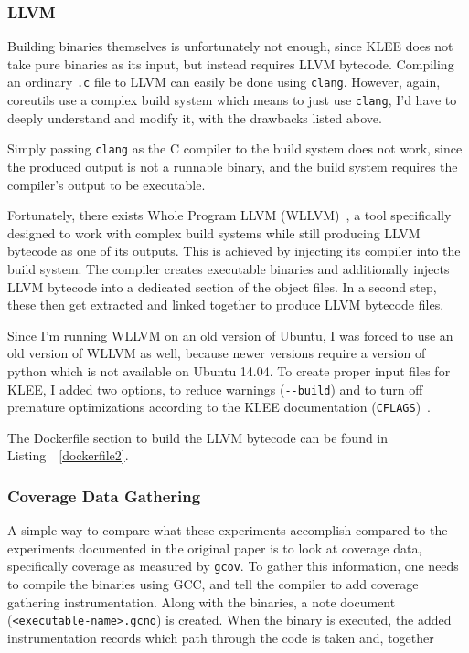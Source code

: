 \documentclass{article}
\let\savedCite=\cite
\renewcommand{\cite}{\unskip~\savedCite}
\let\savedRef=\ref
\renewcommand{\ref}{\unskip~\savedRef}
\begin{document}
\begin{multicols}{2}

    \subsubsection{LLVM}
    \label{LLVM}

    Building binaries themselves is unfortunately not enough, since KLEE does not take pure binaries as its input, but instead requires LLVM bytecode. Compiling an ordinary \lstinline{.c} file to LLVM can easily be done using \lstinline{clang}. However, again, coreutils use a complex build system which means to just use \lstinline{clang}, I'd have to deeply understand and modify it, with the drawbacks listed above.

    Simply passing \lstinline{clang} as the C compiler to the build system does not work, since the produced output is not a runnable binary, and the build system requires the compiler's output to be executable.

    Fortunately, there exists Whole Program LLVM (WLLVM)\cite{WLLVM}, a tool specifically designed to work with complex build systems while still producing LLVM bytecode as one of its outputs. This is achieved by injecting its compiler into the build system. The compiler creates executable binaries and additionally injects LLVM bytecode into a dedicated section of the object files. In a second step, these then get extracted and linked together to produce LLVM bytecode files.

    Since I'm running WLLVM on an old version of Ubuntu, I was forced to use an old version of WLLVM as well, because newer versions require a version of python which is not available on Ubuntu 14.04. To create proper input files for KLEE, I added two options, to reduce warnings (\lstinline{--build}) and to turn off premature optimizations according to the KLEE documentation (\lstinline{CFLAGS})\cite{KLEETutorial}.

    The Dockerfile section to build the LLVM bytecode can be found in Listing~\ref{dockerfile2}.

    \subsubsection{Coverage Data Gathering}
    \label{gcov}

    A simple way to compare what these experiments accomplish compared to the experiments documented in the original paper is to look at coverage data, specifically coverage as measured by \lstinline{gcov}. To gather this information, one needs to compile the binaries using GCC, and tell the compiler to add coverage gathering instrumentation. Along with the binaries, a note document (\lstinline{<executable-name>.gcno}) is created. When the binary is executed, the added instrumentation records which path through the code is taken and, together

\end{multicols}
\end{document}

